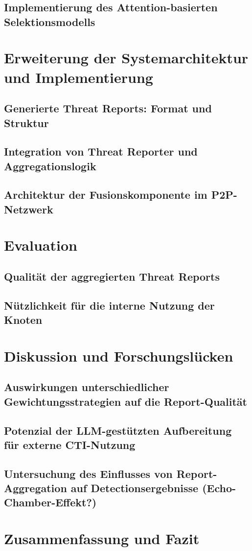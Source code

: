     \subsection{Implementierung des Attention-basierten Selektionsmodells}

\newpage

\section{Erweiterung der Systemarchitektur und Implementierung}
    \subsection{Generierte Threat Reports: Format und Struktur}
    \subsection{Integration von Threat Reporter und Aggregationslogik}
    \subsection{Architektur der Fusionskomponente im P2P-Netzwerk}
    
\newpage

\section{Evaluation}
    \subsection{Qualität der aggregierten Threat Reports}
    \subsection{Nützlichkeit für die interne Nutzung der Knoten}

\newpage

\section{Diskussion und Forschungslücken}
    \subsection{Auswirkungen unterschiedlicher Gewichtungsstrategien auf die Report-Qualität}
    \subsection{Potenzial der LLM-gestützten Aufbereitung für externe CTI-Nutzung}
    \subsection{Untersuchung des Einflusses von Report-Aggregation auf Detectionsergebnisse (Echo-Chamber-Effekt?)}

\newpage

\section{Zusammenfassung und Fazit}

\newpage
